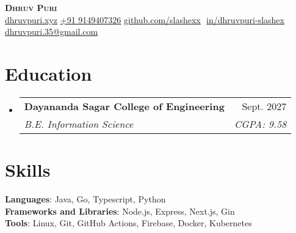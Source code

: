 \documentclass[letterpaper,11pt]{article}
\makeatletter
\newcommand{\resumeSubheading}[4]{
  \vspace{-2pt}\item
    \begin{tabular*}{0.97\textwidth}[t]{l@{\extracolsep{\fill}}r}
      \textbf{#1} & #2 \\
      \textit{\small#3} & \textit{\small #4} \\
    \end{tabular*}\vspace{-7pt}
}
\newcommand{\resumeSubHeadingListStart}{\begin{itemize}[leftmargin=0.15in, label={}]}
\newcommand{\resumeSubHeadingListEnd}{\end{itemize}}
\makeatother
\begin{document}
\begin{flushright}
  \color{gray}
  \item
\end{flushright}

\vspace{-20.5pt}

\begin{center}
    \textbf{\Huge \scshape Dhruv Puri} \\ \vspace{8pt}
    \small 
    \href{https://dhruvpuri.xyz/}
    {\underline{dhruvpuri.xyz}}
    \href{tel:+919149407326}
    {\underline{+91 9149407326}}
    \href{https://github.com/slashexx}{\underline{github.com/slashexx}} $  $
    \href{https://linkedin.com/in/dhruvpuri-slashex}{\underline{in/dhruvpuri-slashex}} $  $
    \href{mailto:dhruvpuri.35@gmail.com}
    {\underline{dhruvpuri.35@gmail.com}}
    
\end{center}

\section{Education}
  \resumeSubHeadingListStart
  
    \resumeSubheading
      {Dayananda Sagar College of Engineering}{Sept. 2027}
      {B.E. Information Science}{CGPA: 9.58}
  \resumeSubHeadingListEnd
\section{Skills}
 \begin{itemize}[leftmargin=0.15in, label={}]
    \small{\item{
    
     \textbf{Languages}{: Java, Go, Typescript, Python} \\
     \textbf{Frameworks and Libraries}{: Node.js, Express, Next.js, Gin} \\
     
     \textbf{Tools}{: Linux, Git, GitHub Actions, Firebase, Docker, Kubernetes}     
     
    }}
 \end{itemize}
 \vspace{-15pt}
 
\end{document}
